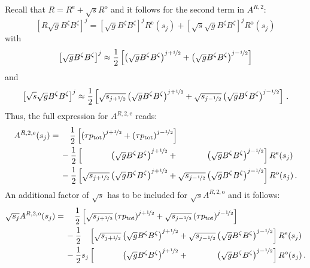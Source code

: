 Recall that $R = R^\mathrm{e} + \sqrt{s} R^\mathrm{o}$ and it follows for the second term in $A^{R,2}$:
\begin{equation}
  \left[ R \sqrt{g} B^\zeta B^\zeta \right]^j
  = \left[ \sqrt{g} B^\zeta B^\zeta \right]^j R^\mathrm{e}(s_j) + \left[ \sqrt{s} \sqrt{g} B^\zeta B^\zeta \right]^j R^\mathrm{o}(s_j)
\end{equation}
with
\begin{equation}
  \left[ \sqrt{g} B^\zeta B^\zeta \right]^j
  \approx
  \frac{1}{2} \left[ \left( \sqrt{g} B^\zeta B^\zeta \right)^{j+\nicefrac{1}{2}} + \left( \sqrt{g} B^\zeta B^\zeta \right)^{j-\nicefrac{1}{2}} \right]
\end{equation}
and
\begin{equation}
  \left[ \sqrt{s} \sqrt{g} B^\zeta B^\zeta \right]^j
  \approx
  \frac{1}{2} \left[ \sqrt{s_{j+\nicefrac{1}{2}}} \left( \sqrt{g} B^\zeta B^\zeta \right)^{j+\nicefrac{1}{2}} + \sqrt{s_{j-\nicefrac{1}{2}}} \left( \sqrt{g} B^\zeta B^\zeta \right)^{j-\nicefrac{1}{2}} \right] \, .
\end{equation}
Thus, the full expression for $A^{R,2,\mathrm{e}}$
reads:
\begin{align}
  A^{R,2,\mathrm{e}} (s_j)
  =&\, \phantom{-}~ \frac{1}{2} \left[ \left( \tau p_\mathrm{tot} \right)^{j+\half} + \left( \tau p_\mathrm{tot} \right)^{j-\half} \right] \nonumber \\
  ~&\,          -   \frac{1}{2} \left[   \phantom{\sqrt{s_{j+\half}}} \left( \sqrt{g} B^\zeta B^\zeta \right)^{j+\half}
                                       + \phantom{\sqrt{s_{j-\half}}} \left( \sqrt{g} B^\zeta B^\zeta \right)^{j-\half} \right] R^\mathrm{e}(s_j) \nonumber \\
  ~&\,          -   \frac{1}{2} \left[            \sqrt{s_{j+\half}}  \left( \sqrt{g} B^\zeta B^\zeta \right)^{j+\half}
                                       +          \sqrt{s_{j-\half}}  \left( \sqrt{g} B^\zeta B^\zeta \right)^{j-\half} \right] R^\mathrm{o}(s_j) \, .
\end{align}
An additional factor of $\sqrt{s}$ has to be included for $\sqrt{s} A^{R,2,\mathrm{o}}$ and it follows:
\begin{align}
  \sqrt{s_j} A^{R,2,\mathrm{o}} (s_j)
  =&\, \phantom{-}~ \frac{1}{2}               \left[            \sqrt{s_{j+\half}}  \left( \tau p_\mathrm{tot} \right)^{j+\half}
                                                     +          \sqrt{s_{j-\half}}  \left( \tau p_\mathrm{tot} \right)^{j-\half} \right] \nonumber \\
  ~&\,          -   \frac{1}{2} \phantom{s_j} \left[            \sqrt{s_{j+\half}}  \left( \sqrt{g} B^\zeta B^\zeta \right)^{j+\half}
                                                     +          \sqrt{s_{j-\half}}  \left( \sqrt{g} B^\zeta B^\zeta \right)^{j-\half} \right] R^\mathrm{e}(s_j) \nonumber \\
  ~&\,          -   \frac{1}{2}          s_j  \left[   \phantom{\sqrt{s_{j+\half}}} \left( \sqrt{g} B^\zeta B^\zeta \right)^{j+\half}
                                                     + \phantom{\sqrt{s_{j-\half}}} \left( \sqrt{g} B^\zeta B^\zeta \right)^{j-\half} \right] R^\mathrm{o}(s_j) \, .
\end{align}
